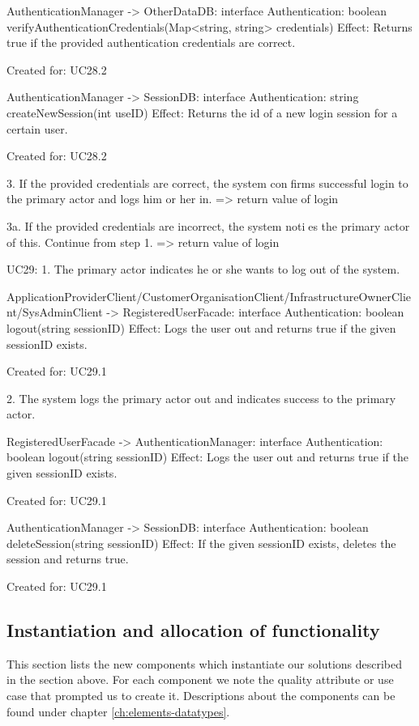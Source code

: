             AuthenticationManager -> OtherDataDB: interface Authentication: boolean verifyAuthenticationCredentials(Map<string, string> credentials)
                Effect: Returns true if the provided authentication credentials are correct.
                \item Created for: UC28.2

            AuthenticationManager -> SessionDB: interface Authentication: string createNewSession(int useID)
                Effect: Returns the id of a new login session for a certain user.
                \item Created for: UC28.2

        3. If the provided credentials are correct, the system confirms successful login to the primary actor and logs him or her in.
            => return value of login

        3a. If the provided credentials are incorrect, the system noties the primary actor of this. Continue from step 1.
            => return value of login

    UC29:
        1. The primary actor indicates he or she wants to log out of the system.

            ApplicationProviderClient/CustomerOrganisationClient/InfrastructureOwnerClient/SysAdminClient -> RegisteredUserFacade: interface Authentication: boolean logout(string sessionID)
                Effect: Logs the user out and returns true if the given sessionID exists.
                \item Created for: UC29.1

        2. The system logs the primary actor out and indicates success to the primary actor.

            RegisteredUserFacade -> AuthenticationManager: interface Authentication: boolean logout(string sessionID)
                Effect: Logs the user out and returns true if the given sessionID exists.
                \item Created for: UC29.1

            AuthenticationManager -> SessionDB: interface Authentication: boolean deleteSession(string sessionID)
                Effect: If the given sessionID exists, deletes the session and returns true.
                \item Created for: UC29.1


\subsection{Instantiation and allocation of functionality}
    This section lists the new components which instantiate our solutions
    described in the section above. For each component we note the quality
    attribute or use case that prompted us to create it. Descriptions about
    the components can be found under chapter \ref{ch:elements-datatypes}. \\

